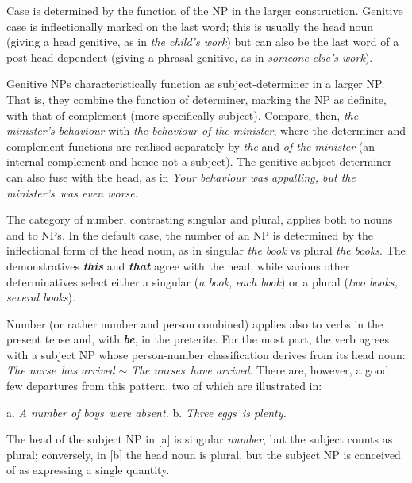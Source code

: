 Case is determined by the function of the NP in the larger construction. Genitive case is inflectionally marked on the last word; this is usually the head noun (giving a {head genitive}, as in \textit{the child's work}) but can also be the last word of a post-head dependent (giving a {phrasal genitive}, as in \textit{someone else's work}).

Genitive NPs characteristically function as {subject-determiner} in a larger NP. That is, they combine the function of determiner, marking the NP as definite, with that of complement (more specifically subject). Compare, then, \textit{the minister's behaviour} with \textit{the behaviour of the minister}, where the determiner and complement functions are realised separately by \textit{the} and \textit{of the minister} (an internal complement and hence not a subject). The genitive subject-determiner can also fuse with the head, as in \textit{Your behaviour was appalling, but \ob the minister's\cb\ was even worse}.

The category of {number}, contrasting singular and plural, applies both to nouns and to NPs. In the default case, the number of an NP is determined by the inflectional form of the head noun, as in singular \textit{the book} vs plural \textit{the books}. The demonstratives \textit{\textbf{this}} and \textit{\textbf{that}} agree with the head, while various other determinatives select either a singular (\textit{a book}, \textit{each book}) or a plural (\textit{two books, several books}). 

Number (or rather number and person combined) applies also to verbs in the present tense and, with \textit{\textbf{be}}, in the preterite. For the most part, the verb agrees with a subject NP whose person-number classification derives from its head noun: \ob\textit{The nurse}\cb\ \textit{has arrived} $\sim$ \ob\textit{The nurses}\cb\ \textit{have arrived}. There are, however, a good few departures from this pattern, two of which are illustrated in:

\begin{examples}
\item \label{ex:25}
    a. \ob \textit{A number of boys\cb\ were absent.}\hspace{3em}
    b. \textit{\ob Three eggs\cb\ is plenty.}
\end{examples}
The head of the subject NP in [a] is singular \textit{number}, but the subject counts as plural; conversely, in [b] the head noun is plural, but the subject NP is conceived of as expressing a single quantity.

